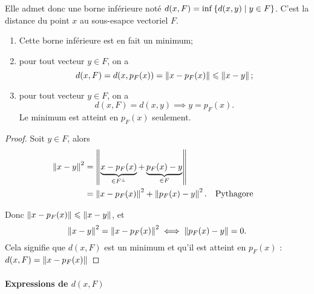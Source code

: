     Elle admet donc une borne inférieure noté \(d(x,F)=\inf\left\{d(x,y)\mathrel{}\middle|\mathrel{}y \in F\right\}\). C'est la distance du point \(x\) au sous-esapce vectoriel \(F\).

    \begin{theo}
      \begin{enumerate}
        \item Cette borne inférieure est en fait un minimum;
        \item pour tout vecteur \(y \in F\), on a
          \begin{equation}
            d(x,F) = d(x,p_F(x)) = \left\lVert x-p_F(x)\right\rVert \leqslant \left\lVert x-y\right\rVert;    
          \end{equation}
        \item pour tout vecteur \(y \in F\), on a
          \begin{equation}
            d(x,F) = d(x,y) \implies y=p_F(x).
          \end{equation}
          Le minimum est atteint en \(p_F(x)\) seulement.
      \end{enumerate}
    \end{theo}
    \begin{proof}
      Soit \(y \in F\), alors
      \begin{align}
        \left\lVert x-y\right\rVert^2 &=\left\lVert\underbrace{x-p_F(x)}_{\in F^\perp} + \underbrace{p_F(x)-y}_{\in F}\right\rVert\\
                      &=\left\lVert x-p_F(x)\right\rVert^2 + \left\lVert p_F(x)-y\right\rVert^2. && \text{Pythagore}
      \end{align}

      Donc \(\left\lVert x-p_F(x)\right\rVert \leqslant \left\lVert x-y\right\rVert\), et
      \begin{equation}
        \left\lVert x-y\right\rVert^2 = \left\lVert x-p_F(x)\right\rVert^2 \iff  \left\lVert p_F(x)-y\right\rVert=0.
      \end{equation}
      Cela signifie que \(d(x,F)\) est un minimum et qu'il est atteint en \(p_F(x)\) : \(d(x,F)=\left\lVert x-p_F(x)\right\rVert\)
    \end{proof}

    \paragraph{Expressions de \(d(x,F)\)}

